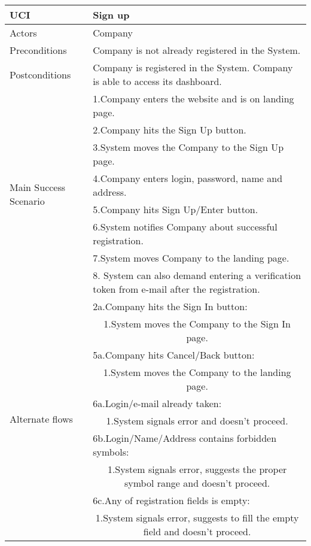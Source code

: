 	\begin{table}[H]
	\centering
	\sffamily\captionsetup{justification=raggedright,singlelinecheck=false,position = below, font = sf}
	\begin{tabular}{|m{3.5cm}|m{11cm}|}
	\hline 
	UCI & Sign up \\
	\hline
	Actors & Company \\
	\hline
	Preconditions & Company is not already registered in the System. \\
	\hline
	Postconditions & Company is registered in the System. Company is able to access its dashboard. \\	
	\hline
	\multirow{8}{*}{Main Success Scenario} & 1.Company enters the website and is on landing page. \\
	\cline{2-2}
	& 2.Company hits the Sign Up button. \\
	\cline{2-2}
	& 3.System moves the Company to the Sign Up page. \\
	\cline{2-2}
	& 4.Company enters login, password, name and address. \\
	\cline{2-2}
	& 5.Company hits Sign Up/Enter button. \\
	\cline{2-2}
	& 6.System notifies Company about successful registration. \\
	\cline{2-2}
	& 7.System moves Company to the landing page. \\
	\cline{2-2}
	& 8. System can also demand entering a verification token from e-mail after the registration. \\
	\hline
	\multirow{10}{*}{Alternate flows} & 2a.Company hits the Sign In button: \\
	\cline{2-2}
	& \multicolumn{1}{c|}{1.System moves the Company to the Sign In page.} \\
	\cline{2-2}
	& 5a.Company hits Cancel/Back button: \\
	\cline{2-2}
	& \multicolumn{1}{c|}{1.System moves the Company to the landing page.} \\
	\cline{2-2}
	& 6a.Login/e-mail already taken: \\
	\cline{2-2}
	& \multicolumn{1}{c|}{1.System signals error and doesn't proceed.} \\
	\cline{2-2}
	& 6b.Login/Name/Address contains forbidden symbols: \\
	\cline{2-2}
	& \multicolumn{1}{c|}{1.System signals error, suggests the proper symbol range and doesn't proceed.} \\
	\cline{2-2}
	& 6c.Any of registration fields is empty: \\
	\cline{2-2}
	& \multicolumn{1}{c|}{1.System signals error, suggests to fill the empty field and doesn't proceed.} \\
	\hline
	\end{tabular}
	\end{table}
	
